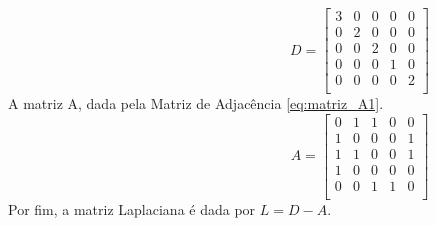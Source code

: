 \begin{equation}\label{eq:matriz_d1}
\hspace{6cm} %
    D = \begin{bmatrix}
         3 & 0 & 0 & 0 & 0 \\ %
         0 & 2 & 0 & 0 & 0 \\ %
         0 & 0 & 2 & 0 & 0 \\ %
         0 & 0 & 0 & 1 & 0 \\ %
         0 & 0 & 0 & 0 & 2 \\ %
    \end{bmatrix}
\end{equation}
A matriz A, dada pela Matriz de Adjacência \ref{eq:matriz_A1}.
\begin{equation}\label{eq:matriz_A1}
\hspace{6cm} %
    A = \begin{bmatrix}
         0 & 1 & 1 & 0 & 0 \\ %
         1 & 0 & 0 & 0 & 1 \\ %
         1 & 1 & 0 & 0 & 1 \\ %
         1 & 0 & 0 & 0 & 0 \\ %
         0 & 0 & 1 & 1 & 0 \\ %
    \end{bmatrix}
\end{equation}
Por fim, a matriz Laplaciana é dada por $L = D - A$.
